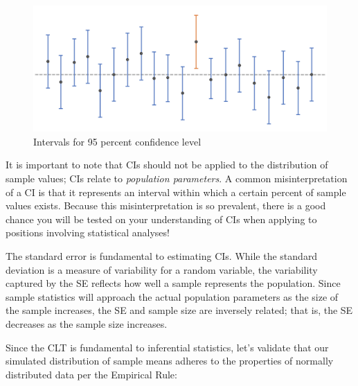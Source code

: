 \documentclass[
]{book}
\newenvironment{Shaded}{\begin{snugshade}}{\end{snugshade}}
\newcommand{\CommentTok}[1]{\textcolor[rgb]{0.56,0.35,0.01}{\textit{#1}}}
\newcommand{\DecValTok}[1]{\textcolor[rgb]{0.00,0.00,0.81}{#1}}
\newcommand{\FunctionTok}[1]{\textcolor[rgb]{0.00,0.00,0.00}{#1}}
\newcommand{\NormalTok}[1]{#1}
\newcommand{\OtherTok}[1]{\textcolor[rgb]{0.56,0.35,0.01}{#1}}
\newcommand{\SpecialCharTok}[1]{\textcolor[rgb]{0.00,0.00,0.00}{#1}}
\newcommand{\StringTok}[1]{\textcolor[rgb]{0.31,0.60,0.02}{#1}}
\begin{document}
\begin{figure}

{\centering \includegraphics[width=0.75\linewidth]{graphics/confidence_intervals} 

}

\caption{Intervals for 95 percent confidence level}\label{fig:conf-int}
\end{figure}

It is important to note that CIs should not be applied to the distribution of sample values; CIs relate to \emph{population parameters}. A common misinterpretation of a CI is that it represents an interval within which a certain percent of sample values exists. Because this misinterpretation is so prevalent, there is a good chance you will be tested on your understanding of CIs when applying to positions involving statistical analyses!

The standard error is fundamental to estimating CIs. While the standard deviation is a measure of variability for a random variable, the variability captured by the SE reflects how well a sample represents the population. Since sample statistics will approach the actual population parameters as the size of the sample increases, the SE and sample size are inversely related; that is, the SE decreases as the sample size increases.

Since the CLT is fundamental to inferential statistics, let's validate that our simulated distribution of sample means adheres to the properties of normally distributed data per the Empirical Rule:

\begin{Shaded}
\end{Shaded}
\end{document}
